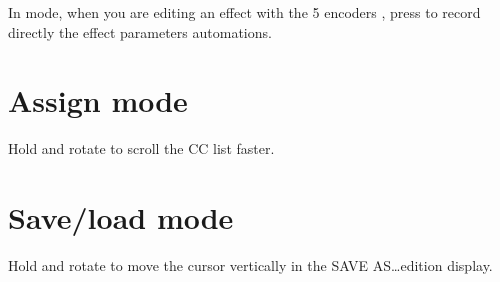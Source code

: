 In  mode, when you are editing an effect with the 5 encoders \encodersicon{}, press  to record directly the effect parameters automations.


\section{Assign mode}

Hold  and rotate \encodericon{} to scroll the CC list faster.


\section{Save/load mode}

Hold  and rotate \encodericon{} to move the cursor vertically in the SAVE AS\ldots edition display.

